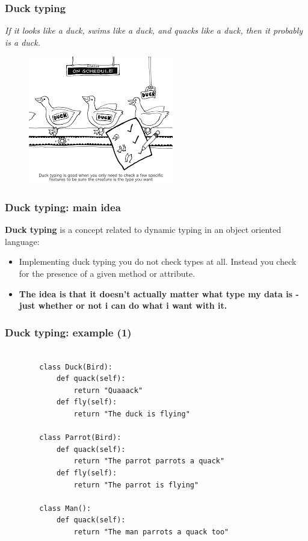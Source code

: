 \documentclass[xcolor ={table,usenames,dvipsnames}]{beamer}
\theoremstyle{definition}
\begin{document}
	

	\begin{frame}
		\frametitle{Duck typing}
		\textit{ If it looks like a duck, swims like a duck, and quacks like a duck, then it probably is a duck.}\\
		\begin{figure}[h!]
			\centering
			\includegraphics[scale=0.85]{img/duck.png}
			\label{Interfacce di un CS}
		\end{figure}
	\end{frame}

	\begin{frame}
		\frametitle{Duck typing: main idea}
		\textbf{Duck typing} is a concept related to dynamic typing in an object oriented language:
		\begin{itemize}
			\item Implementing duck typing you do not check types at all. Instead you check for the presence of a given method or attribute.
			\item \textbf{The idea is that it doesn't actually matter what type my data is - just whether or not i can do what i want with it.}
		\end{itemize}
	\end{frame}

	\begin{frame}[fragile]
		\frametitle{Duck typing: example (1)}
		\begin{lstlisting}[]
		
		class Duck(Bird):
			def quack(self):
				return "Quaaack"
			def fly(self):
				return "The duck is flying"
		
		class Parrot(Bird):
			def quack(self):
				return "The parrot parrots a quack"
			def fly(self):
				return "The parrot is flying"
		
		class Man():
			def quack(self):
				return "The man parrots a quack too"

		\end{lstlisting}
	\end{frame}
\end{document}
